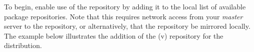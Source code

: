 To begin, enable use of the \FSP{} repository by adding it to the local list of
available package repositories.  Note that this requires network access from
your {\em master} server to the \FSP{} repository, or alternatively, that
the \FSP{} repository be mirrored locally. The example below illustrates the addition
of the \FSP{} ({v\FSPVersion{}}) repository for the \baseOS{} distribution.

